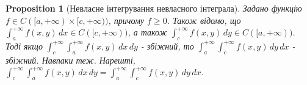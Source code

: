 \documentclass[a4paper, 10pt]{article}
\def\huge{\displaystyle}
\theoremstyle{theoremdd}
\theoremstyle{theoremdd}
\theoremstyle{theoremdd}
\theoremstyle{theoremdd}
\theoremstyle{theoremdd}
\theoremstyle{theoremdd}
\newtheorem{proposition}[theorem]{Proposition}
\theoremstyle{theoremdd}
\theoremstyle{theoremdd}
\theoremstyle{theoremdd}
\begin{document}
\begin{proposition}[Невласне інтегрування невласного інтеграла]

Задано функцію $f \in C([a,+\infty) \times [c,+\infty))$, причому $f \geq 0$. Також відомо, що $\huge\int_a^{+\infty} f(x,y)\,dx \in C([c,+\infty))$, а також $\huge\int_c^{+\infty} f(x,y)\,dy \in C([a,+\infty))$.\\
Тоді якщо $\huge\int_c^{+\infty} \int_a^{+\infty} f(x,y)\,dx\,dy$ - збіжний, то $\huge\int_a^{+\infty} \int_c^{+\infty} f(x,y)\,dy\,dx$ - збіжний. Навпаки теж. Нарешті,\\
$\huge\int_c^{+\infty} \int_a^{+\infty} f(x,y)\,dx\,dy = \huge\int_a^{+\infty} \int_c^{+\infty} f(x,y)\,dy\,dx$.
\end{proposition}
\end{document}
